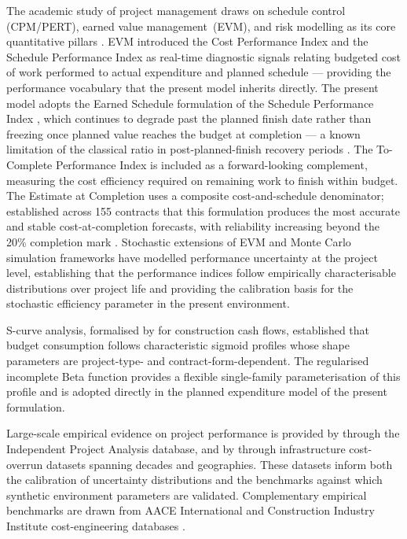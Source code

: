 The academic study of project management draws on schedule control
(CPM/PERT), earned value management~(EVM), and risk modelling as its
core quantitative pillars \citep{Fleming2010, PMI2021}. EVM introduced
the Cost Performance Index and the Schedule Performance Index as
real-time diagnostic signals relating budgeted cost of work performed
to actual expenditure and planned schedule --- providing the
performance vocabulary that the present model inherits directly. The
present model adopts the Earned Schedule formulation of the Schedule
Performance Index \citep{Lipke2003}, which continues to degrade past
the planned finish date rather than freezing once planned value
reaches the budget at completion --- a known limitation of the
classical ratio in post-planned-finish recovery periods
\citep{Lipke2003, Henderson2004}. The To-Complete Performance Index
is included as a forward-looking complement, measuring the cost
efficiency required on remaining work to finish within budget.
The Estimate at Completion uses a composite cost-and-schedule
denominator; \citet{christensen1993cost} established across 155
contracts that this formulation produces the most accurate and stable
cost-at-completion forecasts, with reliability increasing beyond the
20\% completion mark \citep{Lipke2003}. Stochastic extensions of EVM
\citep{Acebes2015, Batselier2017} and Monte Carlo simulation
frameworks \citep{Kwak2007} have modelled performance uncertainty at
the project level, establishing that the performance indices follow
empirically characterisable distributions over project life and
providing the calibration basis for the stochastic efficiency
parameter in the present environment.

S-curve analysis, formalised by \citet{Kenley2009} for construction
cash flows, established that budget consumption follows characteristic
sigmoid profiles whose shape parameters are project-type- and
contract-form-dependent. The regularised incomplete Beta function
provides a flexible single-family parameterisation of this profile
\citep{barraza2004probabilistic} and is adopted directly in the
planned expenditure model of the present formulation.

Large-scale empirical evidence on project performance is provided by
\citet{Merrow2011} through the Independent Project Analysis database,
and by \citet{Flyvbjerg2003, Flyvbjerg2018} through infrastructure
cost-overrun datasets spanning decades and geographies. These datasets
inform both the calibration of uncertainty distributions and the
benchmarks against which synthetic environment parameters are
validated. Complementary empirical benchmarks are drawn from AACE
International and Construction Industry Institute cost-engineering
databases \citep{christensen1993cost}.

